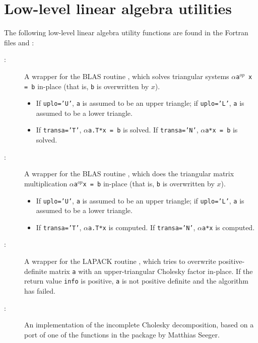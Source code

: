 \documentclass[]{manual}
\begin{document}
\section{Low-level linear algebra utilities}
The following low-level linear algebra utility functions are found in the Fortran files  and  :
\begin{description}

    \item[:] A wrapper for the BLAS routine , which solves triangular systems \texttt{$\alpha$a$^{op}$ x = b} in-place (that is, \texttt{b} is overwritten by $x$). 
    \begin{itemize}
        \item If \texttt{uplo='U'}, \texttt{a} is assumed to be an upper triangle; if \texttt{uplo='L'}, \texttt{a} is assumed to be a lower triangle.
        \item If \texttt{transa='T'}, \texttt{$\alpha$a.T*x = b} is solved. If \texttt{transa='N'}, \texttt{$\alpha$a*x = b} is solved.
    \end{itemize}
    
    \item[:] A wrapper for the BLAS routine , which does the triangular matrix multiplication \texttt{$\alpha$a$^{op}$x = b} in-place (that is, \texttt{b} is overwritten by $x$).
    \begin{itemize}
        \item If \texttt{uplo='U'}, \texttt{a} is assumed to be an upper triangle; if \texttt{uplo='L'}, \texttt{a} is assumed to be a lower triangle.
        \item If \texttt{transa='T'}, \texttt{$\alpha$a.T*x} is computed. If \texttt{transa='N'}, \texttt{$\alpha$a*x} is computed.
    \end{itemize}
    
    \item[:] A wrapper for the LAPACK routine , which tries to overwrite positive-definite matrix \texttt{a} with an upper-triangular Cholesky factor in-place. If the return value \texttt{info} is positive, \texttt{a} is not positive definite and the algorithm has failed.
    
    \item[:] An implementation of the incomplete Cholesky decomposition, based on a port of one of the functions in the  package by Matthias Seeger. 
    

\end{description}
\end{document}
